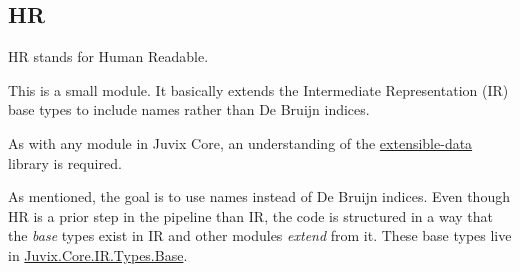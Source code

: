 \documentclass[acmsmall]{acmart}
\numberwithin{figure}{subsection}
\begin{document}
\subsection{HR}

HR stands for Human Readable.

This is a small module. It basically extends the Intermediate Representation (IR) base types to include names rather than De Bruijn indices.

As with any module in Juvix Core, an understanding of the \href{https://heliaxdev.github.io/extensible-data/Extensible.html}{extensible-data} library is required.

As mentioned, the goal is to use names instead of De Bruijn indices. Even though HR is a prior step in the pipeline than IR, the code is structured in a way that the \textit{base} types exist in IR and other modules \textit{extend} from it. These base types live in \href{https://github.com/heliaxdev/juvix/blob/develop/library/Core/src/Juvix/Core/IR/Types/Base.hs}{Juvix.Core.IR.Types.Base}. 
    
\end{document}
